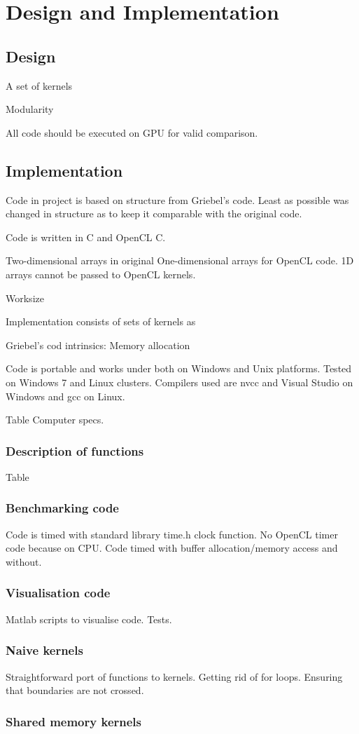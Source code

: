 \chapter{Design and Implementation}

\section{Design}

A set of kernels

Modularity

All code should be executed on GPU for valid comparison. 


\section{Implementation}
Code in project is based on structure from Griebel's code. Least as possible was changed in structure as to keep it comparable with the original code.

Code is written in C and OpenCL C.

Two-dimensional arrays in original 
One-dimensional arrays for OpenCL code. 1D arrays cannot be passed to OpenCL kernels.

Worksize

Implementation consists of sets of kernels as 

Griebel's cod intrinsics: Memory allocation

Code is portable and works under both on Windows and Unix platforms. Tested on Windows 7 and Linux clusters. Compilers used are nvcc and Visual Studio on Windows and gcc on Linux.

Table Computer specs.



\subsection{Description of functions}

Table

\subsection{Benchmarking code}
Code is timed with standard library time.h clock function.
No OpenCL timer code because on CPU. Code timed with buffer allocation/memory access and without.

\subsection{Visualisation code}
Matlab scripts to visualise code. Tests.

\subsection{Naive kernels}
Straightforward port of functions to kernels. Getting rid of for loops. Ensuring that boundaries are not crossed.


\subsection{Shared memory kernels}